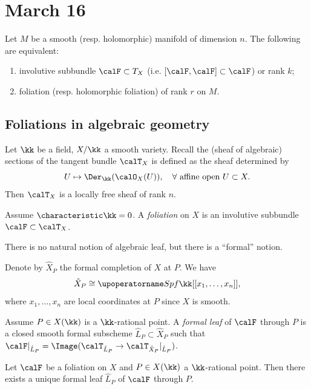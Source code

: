 \section{March 16}

Let $M$ be a smooth (resp. holomorphic) manifold of dimension $n$. 
The following are equivalent:
\begin{enumerate}
  \item involutive subbundle $\calF \subset T_X$ (i.e. $[\calF, \calF] \subset \calF$) or rank $k$;
  \item foliation (resp. holomorphic foliation) of rank $r$ on $M$.
\end{enumerate}


\subsection{Foliations in algebraic geometry}

  Let $\kk$ be a field, $X/\kk$ a smooth variety.
  Recall the (sheaf of algebraic) sections of the tangent bundle $\calT_X$ is defined as the sheaf determined by 
  \[ U \mapsto \Der_\kk(\calO_X(U)), \quad \forall \text{ affine open } U \subset X. \]
  Then $\calT_X$ is a locally free sheaf of rank $n$.
  
  \begin{definition}
    Assume $\characteristic \kk = 0$. 
    A \emph{foliation} on $X$ is an involutive subbundle $\calF \subset \calT_X$.
  \end{definition}

  \begin{remark}
    There is no natural notion of algebraic leaf, but there is a ``formal'' notion.
  \end{remark}

  Denote by $\hat{X}_P$ the formal completion of $X$ at $P$.
  We have 
  \[\hat{X}_P \cong \Spf \kk[[x_1, \dots, x_n]], \]
  where $x_1, \dots, x_n$ are local coordinates at $P$ since $X$ is smooth.
  

  \begin{definition}
    Assume $P \in X(\kk)$ is a $\kk$-rational point.
    A \emph{formal leaf} of $\calF$ through $P$ is a closed smooth formal subscheme $\hat{L}_P \subset \hat{X}_P$ such that $\calF|_{\hat{L}_P} = \Image(\calT_{\hat{L}_P} \to \calT_{\hat{X}_P}|_{\hat{L}_P})$.
  \end{definition}

  \begin{theorem}
    Let $\calF$ be a foliation on $X$ and $P \in X(\kk)$ a $\kk$-rational point. 
    Then there exists a unique formal leaf $\hat{L}_P$ of $\calF$ through $P$.
  \end{theorem}

